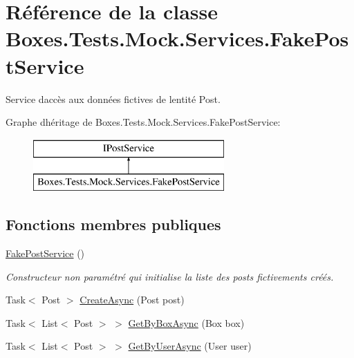 \hypertarget{class_boxes_1_1_tests_1_1_mock_1_1_services_1_1_fake_post_service}{}\section{Référence de la classe Boxes.\+Tests.\+Mock.\+Services.\+Fake\+Post\+Service}
\label{class_boxes_1_1_tests_1_1_mock_1_1_services_1_1_fake_post_service}


Service d\textquotesingle{}accès aux données fictives de l\textquotesingle{}entité Post.  


Graphe d\textquotesingle{}héritage de Boxes.\+Tests.\+Mock.\+Services.\+Fake\+Post\+Service\+:\begin{figure}[H]
\begin{center}
\leavevmode
\includegraphics[height=2.000000cm]{class_boxes_1_1_tests_1_1_mock_1_1_services_1_1_fake_post_service}
\end{center}
\end{figure}
\subsection*{Fonctions membres publiques}
\begin{DoxyCompactItemize}
\item 
\hyperlink{class_boxes_1_1_tests_1_1_mock_1_1_services_1_1_fake_post_service_af5ed93d1526994a72e03389c2d33da67}{Fake\+Post\+Service} ()
\begin{DoxyCompactList}\small\item\em Constructeur non paramétré qui initialise la liste des posts fictivements créés. \end{DoxyCompactList}\item 
Task$<$ Post $>$ \hyperlink{class_boxes_1_1_tests_1_1_mock_1_1_services_1_1_fake_post_service_a353b1b5fe4a1fd04f2a7e40cec1a1810}{Create\+Async} (Post post)
\item 
Task$<$ List$<$ Post $>$ $>$ \hyperlink{class_boxes_1_1_tests_1_1_mock_1_1_services_1_1_fake_post_service_a42ecce94c2243bfa6d8833bd8db8344e}{Get\+By\+Box\+Async} (Box box)
\item 
Task$<$ List$<$ Post $>$ $>$ \hyperlink{class_boxes_1_1_tests_1_1_mock_1_1_services_1_1_fake_post_service_ad559e120252973aa279b7dfdc2043f9c}{Get\+By\+User\+Async} (User user)
\end{DoxyCompactItemize}
